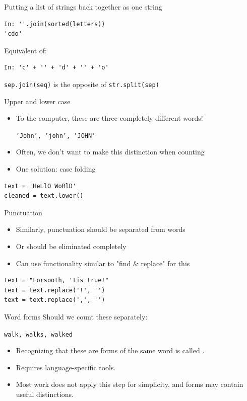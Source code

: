\documentclass[aspectratio=169,usenames,dvipsnames]{beamer}
\begin{document}
\begin{frame}[fragile]{Putting a list of strings back together as one string}
\begin{lstlisting}
In: ''.join(sorted(letters))
'cdo'
\end{lstlisting}
Equivalent of:
\begin{lstlisting}
In: 'c' + '' + 'd' + '' + 'o'
\end{lstlisting}

\texttt{sep.join(seq)} is the opposite of \texttt{str.split(sep)}
\end{frame}

\begin{frame}[fragile]{Upper and lower case}
    \begin{itemize}
        \item To the computer, these
            are three completely different words!

            \texttt{'John', 'john', 'JOHN'}
        \item Often, we don't want to make this distinction when counting
        \item One solution: case folding
    \end{itemize}
    \pause
\begin{lstlisting}
text = 'HeLlO WoRlD'
cleaned = text.lower()
\end{lstlisting}
\end{frame}

\begin{frame}[fragile]{Punctuation}
    \begin{itemize}
        \item Similarly, punctuation should be separated from words
        \item Or should be eliminated completely
        \item Can use functionality similar to "find \& replace" for this
    \end{itemize}
    \pause
\begin{lstlisting}
text = "Forsooth, 'tis true!"
text = text.replace('!', '')
text = text.replace(',', '')
\end{lstlisting}
\end{frame}

\begin{frame}{Word forms}
    Should we count these separately:

    \texttt{walk, walks, walked}

    \begin{itemize}
    \item Recognizing that these are forms of the same word
    is called .

    \item Requires language-specific tools.

    \item Most work does not apply this step for simplicity,
    and forms may contain useful distinctions.
    \end{itemize}
\end{frame}
\end{document}
